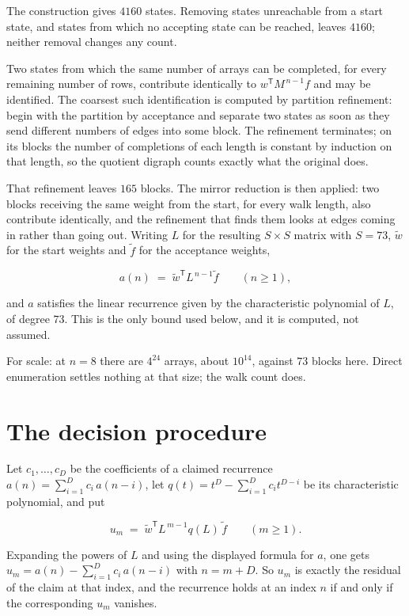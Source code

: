 \documentclass[11pt]{article}
\theoremstyle{definition}
\begin{document}
The construction gives $4160$ states. Removing states unreachable from a start state, and states from which no accepting state can be reached, leaves $4160$; neither removal changes any count.

Two states from which the same number of arrays can be completed, for every remaining number of rows, contribute identically to $w^{\mathsf T}M^{\,n-1}f$ and may be identified. The coarsest such identification is computed by partition refinement: begin with the partition by acceptance and separate two states as soon as they send different numbers of edges into some block. The refinement terminates; on its blocks the number of completions of each length is constant by induction on that length, so the quotient digraph counts exactly what the original does.

That refinement leaves $165$ blocks. The mirror reduction is then applied: two blocks receiving the same weight from the start, for every walk length, also contribute identically, and the refinement that finds them looks at edges coming in rather than going out. Writing $L$ for the resulting $S \times S$ matrix with $S = 73$, $\tilde w$ for the start weights and $\tilde f$ for the acceptance weights,

\[a(n) \;=\; \tilde w^{\mathsf T} L^{\,n-1} \tilde f \qquad (n \ge 1),\]

and $a$ satisfies the linear recurrence given by the characteristic polynomial of $L$, of degree $73$. This is the only bound used below, and it is computed, not assumed.

For scale: at $n = 8$ there are $4^{24}$ arrays, about $10^{14}$, against $73$ blocks here. Direct enumeration settles nothing at that size; the walk count does.

\section{The decision procedure}

Let $c_1,\dots,c_D$ be the coefficients of a claimed recurrence $a(n) = \sum_{i=1}^{D} c_i\,a(n-i)$, let $q(t) = t^{D} - \sum_{i=1}^{D} c_i t^{D-i}$ be its characteristic polynomial, and put

\[u_m \;=\; \tilde w^{\mathsf T} L^{\,m-1} q(L)\,\tilde f \qquad (m \ge 1).\]

Expanding the powers of $L$ and using the displayed formula for $a$, one gets $u_m = a(n) - \sum_{i=1}^{D} c_i\,a(n-i)$ with $n = m + D$. So $u_m$ is exactly the residual of the claim at that index, and the recurrence holds at an index $n$ if and only if the corresponding $u_m$ vanishes.
\end{document}
